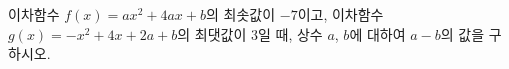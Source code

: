 이차함수 $f(x)=ax^2+4ax+b$의 최솟값이 $-7$이고, 이차함수 $g(x)=-x^2+4x+2a+b$의 최댓값이 $3$일 때, 상수 $a$, $b$에 대하여 $a-b$의 값을 구하시오.
